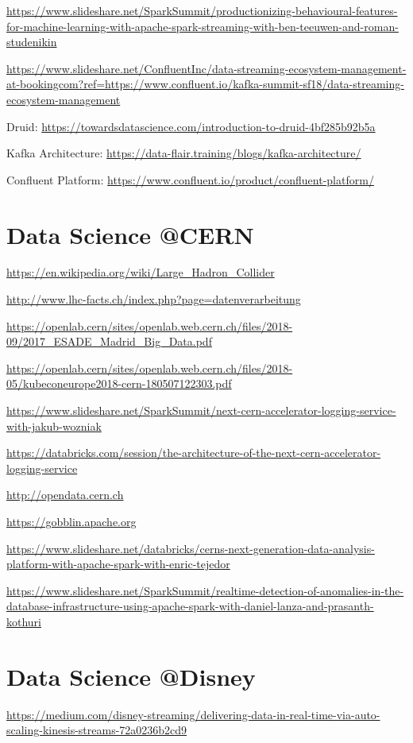 \documentclass[12pt, numbers=noenddot]{scrreprt} %
\begin{document}
\url{https://www.slideshare.net/SparkSummit/productionizing-behavioural-features-for-machine-learning-with-apache-spark-streaming-with-ben-teeuwen-and-roman-studenikin}

\url{https://www.slideshare.net/ConfluentInc/data-streaming-ecosystem-management-at-bookingcom?ref=https://www.confluent.io/kafka-summit-sf18/data-streaming-ecosystem-management}

Druid:
\url{https://towardsdatascience.com/introduction-to-druid-4bf285b92b5a}

Kafka Architecture:
\url{https://data-flair.training/blogs/kafka-architecture/}

Confluent Platform:
\url{https://www.confluent.io/product/confluent-platform/}


\section{Data Science @CERN}
\url{https://en.wikipedia.org/wiki/Large_Hadron_Collider}

\url{http://www.lhc-facts.ch/index.php?page=datenverarbeitung}

\url{https://openlab.cern/sites/openlab.web.cern.ch/files/2018-09/2017_ESADE_Madrid_Big_Data.pdf}

\url{https://openlab.cern/sites/openlab.web.cern.ch/files/2018-05/kubeconeurope2018-cern-180507122303.pdf}

\url{https://www.slideshare.net/SparkSummit/next-cern-accelerator-logging-service-with-jakub-wozniak}

\url{https://databricks.com/session/the-architecture-of-the-next-cern-accelerator-logging-service}

\url{http://opendata.cern.ch}

\url{https://gobblin.apache.org}

\url{https://www.slideshare.net/databricks/cerns-next-generation-data-analysis-platform-with-apache-spark-with-enric-tejedor}

\url{https://www.slideshare.net/SparkSummit/realtime-detection-of-anomalies-in-the-database-infrastructure-using-apache-spark-with-daniel-lanza-and-prasanth-kothuri}


\section{Data Science @Disney}
\url{https://medium.com/disney-streaming/delivering-data-in-real-time-via-auto-scaling-kinesis-streams-72a0236b2cd9}
\end{document}
